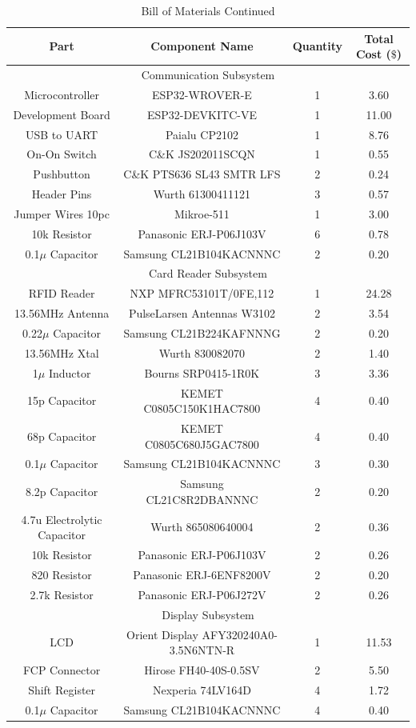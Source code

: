 \documentclass[12pt]{article}
\begin{document}
\begin{table}[!h]
	\caption{Bill of Materials Continued}
	\label{tab:block_comps_cont}
	\centering
	{\small
	\begin{tabular}{ |c|c|c|c| } 
 		\hline
 		\textbf{Part} & \textbf{Component Name} & \textbf{Quantity} & \textbf{Total Cost} ($\$$) \\
 		\hline
 		\hline
 		\multicolumn{4}{|c|}{Communication Subsystem} \\
 		\hline
 		Microcontroller & ESP32-WROVER-E & 1 & 3.60 \\
 		Development Board & ESP32-DEVKITC-VE & 1 & 11.00 \\
 		USB to UART & Paialu CP2102 & 1 & 8.76 \\
 		On-On Switch & C\&K JS202011SCQN & 1 & 0.55 \\
 		Pushbutton & C\&K PTS636 SL43 SMTR LFS & 2 & 0.24 \\
 		Header Pins & Wurth 61300411121 & 3 & 0.57 \\
 		Jumper Wires 10pc & Mikroe-511 & 1 & 3.00 \\
 		10k Resistor & Panasonic ERJ-P06J103V & 6 & 0.78 \\
 		0.1$\mu$ Capacitor & Samsung CL21B104KACNNNC & 2 & 0.20 \\
 		\hline
 		\multicolumn{4}{|c|}{Card Reader Subsystem} \\
 		\hline
 		RFID Reader & NXP MFRC53101T/0FE,112 & 1 & 24.28 \\
 		13.56MHz Antenna & PulseLarsen Antennas W3102 & 2 & 3.54 \\
 		0.22$\mu$ Capacitor & Samsung CL21B224KAFNNNG & 2 & 0.20 \\
 		13.56MHz Xtal & Wurth 830082070 & 2 & 1.40 \\
 		1$\mu$ Inductor & Bourns SRP0415-1R0K & 3 & 3.36 \\
 		15p Capacitor & KEMET C0805C150K1HAC7800 & 4 & 0.40 \\
 		68p Capacitor & KEMET C0805C680J5GAC7800 & 4 & 0.40 \\
 		0.1$\mu$ Capacitor & Samsung CL21B104KACNNNC & 3 & 0.30 \\
 		8.2p Capacitor & Samsung CL21C8R2DBANNNC & 2 & 0.20 \\
 		4.7u Electrolytic Capacitor & Wurth 865080640004 & 2 & 0.36 \\
 		10k Resistor & Panasonic ERJ-P06J103V & 2 & 0.26 \\
 		820 Resistor & Panasonic ERJ-6ENF8200V & 2 & 0.20 \\
 		2.7k Resistor & Panasonic ERJ-P06J272V & 2 & 0.26 \\
 		\hline
 		\multicolumn{4}{|c|}{Display Subsystem} \\
 		\hline
 		LCD & Orient Display AFY320240A0-3.5N6NTN-R & 1 & 11.53 \\
 		FCP Connector & Hirose FH40-40S-0.5SV & 2 & 5.50 \\
 		Shift Register & Nexperia 74LV164D & 4 & 1.72 \\
 		0.1$\mu$ Capacitor & Samsung CL21B104KACNNNC & 4 & 0.40 \\
 		\hline
	\end{tabular}
	}
\end{table}
\end{document}
